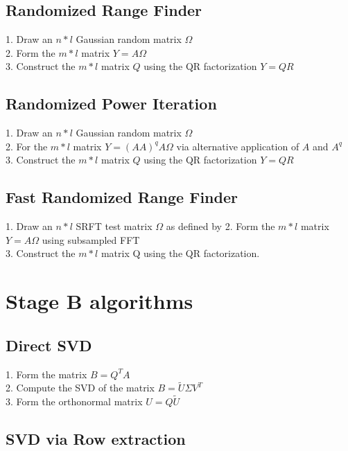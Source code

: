 \documentclass[onecolumn,12pt]{article}
\begin{document}
\subsection{Randomized Range Finder}

1. Draw an $n * l$ Gaussian random matrix $\Omega$ \\
2. Form the $m * l$ matrix $Y = A \Omega$ \\
3. Construct the $m * l$ matrix $Q$ using the QR factorization $Y = QR$

\subsection{Randomized Power Iteration}

1. Draw an $n * l$ Gaussian random matrix $\Omega$ \\
2. For the $m * l$ matrix $Y = (AA)^qA\Omega$ via alternative application of
$A$ and $A^q$ \\
3. Construct the $m * l$ matrix $Q$ using the QR factorization $Y = QR$


\subsection{Fast Randomized Range Finder}

1. Draw an $n * l$ SRFT test matrix $\Omega$ as defined by %
2. Form the $m * l$ matrix $Y = A \Omega$ using subsampled FFT \\
3. Construct the $m *l$ matrix Q using the QR factorization. \\


\section{Stage B algorithms}

\subsection{Direct SVD}

1. Form the matrix $B = Q^T A$ \\
2. Compute the SVD of the matrix $ B = \tilde{U}\Sigma V^T$ \\
3. Form the orthonormal matrix $U = Q \tilde{U}$ \\

\subsection{SVD via Row extraction}
\end{document}
